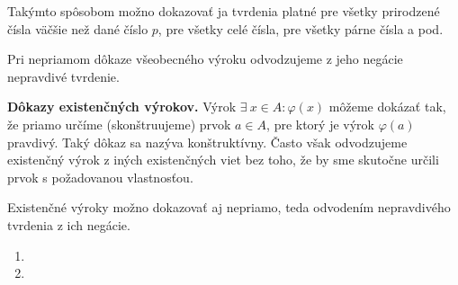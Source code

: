 Takýmto spôsobom možno dokazovať ja tvrdenia platné pre všetky prirodzené čísla
väčšie než dané číslo $p$, pre všetky celé čísla, pre všetky párne čísla a pod.

Pri nepriamom dôkaze všeobecného výroku odvodzujeme z jeho negácie nepravdivé tvrdenie.

\textbf{Dôkazy existenčných výrokov.} Výrok $\exists ~ x \in A: \varphi (x)$
môžeme dokázať tak, že priamo určíme (skonštruujeme) prvok $a \in A$, pre ktorý
je výrok $\varphi (a)$ pravdivý. Taký dôkaz sa nazýva konštruktívny. Často však
odvodzujeme existenčný výrok z iných existenčných viet bez toho, že by sme
skutočne určili prvok s požadovanou vlastnosťou.

Existenčné výroky možno dokazovať aj nepriamo, teda odvodením nepravdivého
tvrdenia z ich negácie.

\begin{comment}
\begin{enumerate}
  \item Určte negácie následujúcich výrokov:
  
  \item Namiesto bodiek doplňte slová \enquote{je nutné}, \enquote{stačí},
        \enquote{je nutné a stačí} tak, aby vznikol pravdivý výrok:
  \begin{enumerate}[label=\arabic*.]
    \item aby súčet dvoch celých čísel bol deliteľný 2, $\ldots$ , aby každý
          sčítanec bol deliteľný 2;
    \item aby celé číslo bolo deliteľné 100, $\ldots$ , aby bolo deliteľné 10;
    \item aby celé číslo bolo deliteľné 100, $\ldots$ , aby bolo deliteľné
          1000;
    \item aby platila nerovnosť $\frac{1}{x} < 1, \ldots$ , aby bolo $x > 1$;
    \item aby platilo $\frac{1}{x} < 1, \ldots$ , aby bolo $x > 1$ alebo
          $x < 0$;
  \end{enumerate}
\end{enumerate}
\end{comment}

\begin{enumerate}
  \item {}
  \item {}
\end{enumerate}
